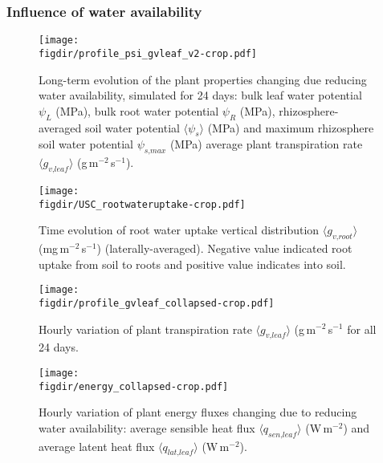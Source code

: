 \subsubsection*{Influence of water availability}

\begin{figure}[p]
	\centering
	\texttt{[image: \\figdir/profile\_psi\_gvleaf\_v2-crop.pdf]}
	\caption{Long-term evolution of the plant properties changing due reducing water availability, simulated for 24 days:  bulk leaf water potential $\psi_L$ (MPa), bulk root water potential $\psi_R$ (MPa), rhizosphere-averaged soil water potential $\langle \psi_s \rangle$ (MPa) and maximum rhizosphere soil water potential $\psi_{\textit{s,max}}$ (MPa)  average plant transpiration rate $\langle g_{\textit{v,leaf}} \rangle$ (g\,m$^{-2}$\,s$^{-1}$). }
	\label{fig:profile_psi_gvleaf}
\end{figure}

\begin{sidewaysfigure}[p]
	\centering
	\texttt{[image: \\figdir/USC\_rootwateruptake-crop.pdf]}
	\caption{Time evolution of root water uptake vertical distribution $\langle g_{\textit{v,root}} \rangle$ (mg\,m$^{-2}$\,s$^{-1}$) (laterally-averaged). Negative value indicated root uptake from soil to roots and positive value indicates into soil.}
	\label{fig:USC_rootwateruptake}
\end{sidewaysfigure}

\begin{figure}[p]
	\centering
	\texttt{[image: \\figdir/profile\_gvleaf\_collapsed-crop.pdf]}
	\caption{Hourly variation of plant transpiration rate $\langle g_{\textit{v,leaf}} \rangle$ (g\,m$^{-2}$\,s$^{-1}$ for all 24 days.}
	\label{fig:profile_gvleaf_collapsed}
\end{figure}

\begin{figure}[p]
	\centering
	\texttt{[image: \\figdir/energy\_collapsed-crop.pdf]}
	\caption{Hourly variation of plant energy fluxes changing due to reducing water availability:  average sensible heat flux $\langle q_{\textit{sen,leaf}} \rangle$ (W\,m$^{-2}$) and  average latent heat flux $\langle q_{\textit{lat,leaf}} \rangle$ (W\,m$^{-2}$). }
	\label{fig:energy_collapsed}
\end{figure}

